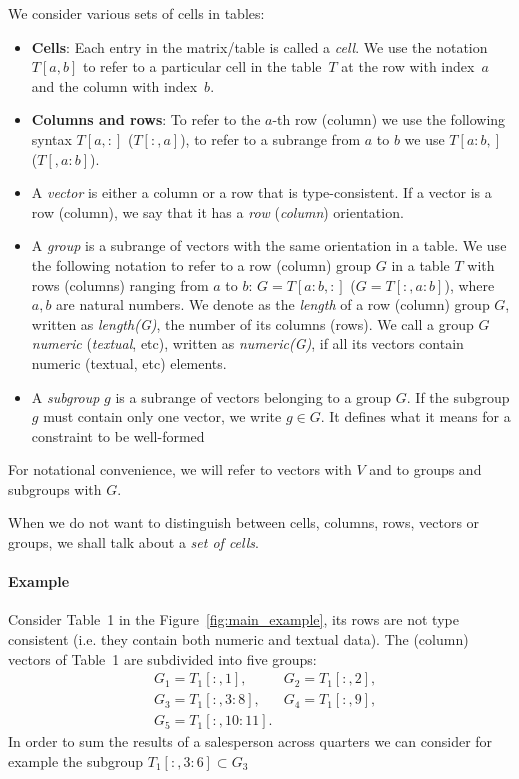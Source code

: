 \documentclass{ecai}
\newcommand{\groups}{\ensuremath{\mathcal{G}}\xspace}
\newcommand{\range}[3]{\ensuremath{#1[#2,#3]}}
\newcommand{\rangeto}[2]{#1{:}#2}
\newcommand{\rangeall}{:}
\begin{document}
We consider various sets of cells in tables:
\begin{itemize}
  \item {\bf Cells}: Each entry in the matrix/table is called  a \textit{cell}.
  We use the notation $T[a,b]$ to refer to a particular cell in the table~$T$ at the row with index~$a$ and the column with index~$b$.
  \item {\bf Columns and rows}: To refer to the $a$-th row (column) we use the following syntax $T[a,{:}]$ ($T[{:},a]$), to refer to a subrange from $a$ to $b$ we use $T[a{:}b,]$ ($T[,a{:}b]$).
  \item
  A \textit{vector} is either a column or a row that is type-consistent.
  If a vector is a row (column), we say that it has a \textit{row} (\textit{column}) orientation.
  \item
  A \textit{group} is a subrange of vectors with the same orientation in a table.
  We use the following notation to refer to a row (column) group $G$ in a table $T$ with rows (columns) ranging from $a$ to $b$: $G = T[a{:}b,:]$ ($G = T[{:},a{:}b]$), where $a,b$ are natural numbers.
  We denote as the \textit{length} of a row (column) group $G$, written as \textit{length(G)}, the number of its columns (rows). We call a group $G$ \textit{numeric} (\textit{textual}, etc), written as \textit{numeric(G)}, if all its vectors contain numeric (textual, etc) elements.
  \item
 A \textit{subgroup} $g$ is a subrange of vectors belonging to a group $G$. If the subgroup $g$ must contain only one vector, we write $g \in G$. It defines what it means for a constraint to be well-formed
\end{itemize}
For notational convenience, we will refer to vectors with $V$ and to groups and subgroups with $G$.

When we do not want to distinguish between cells, columns, rows, vectors or groups, we shall talk about a {\em set of cells}.

\paragraph{Example}
Consider Table~1 in the Figure~\ref{fig:main_example}, its rows are not type consistent (i.e. they contain both numeric and textual data).
The (column) vectors of Table~1 are subdivided into five groups:
\begin{align*}
&G_1 = \range{T_1}{\rangeall}{1},
&G_2 = \range{T_1}{\rangeall}{2},\\
&G_3 = \range{T_1}{\rangeall}{\rangeto{3}{8}},
&G_4 = \range{T_1}{\rangeall}{9},\\
&G_5 = \range{T_1}{\rangeall}{\rangeto{10}{11}}.
\end{align*}
In order to sum the results of a salesperson across quarters we can consider for example the subgroup $\range{T_1}{\rangeall}{\rangeto{3}{6}} \subset G_3$
\end{document}
